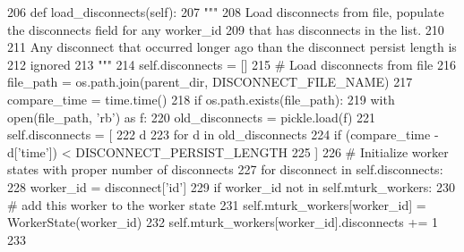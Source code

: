 \begin{DoxyCode}
206     \textcolor{keyword}{def }load\_disconnects(self):
207         \textcolor{stringliteral}{"""}
208 \textcolor{stringliteral}{        Load disconnects from file, populate the disconnects field for any worker\_id}
209 \textcolor{stringliteral}{        that has disconnects in the list.}
210 \textcolor{stringliteral}{}
211 \textcolor{stringliteral}{        Any disconnect that occurred longer ago than the disconnect persist length is}
212 \textcolor{stringliteral}{        ignored}
213 \textcolor{stringliteral}{        """}
214         self.disconnects = []
215         \textcolor{comment}{# Load disconnects from file}
216         file\_path = os.path.join(parent\_dir, DISCONNECT\_FILE\_NAME)
217         compare\_time = time.time()
218         \textcolor{keywordflow}{if} os.path.exists(file\_path):
219             with open(file\_path, \textcolor{stringliteral}{'rb'}) \textcolor{keyword}{as} f:
220                 old\_disconnects = pickle.load(f)
221                 self.disconnects = [
222                     d
223                     \textcolor{keywordflow}{for} d \textcolor{keywordflow}{in} old\_disconnects
224                     \textcolor{keywordflow}{if} (compare\_time - d[\textcolor{stringliteral}{'time'}]) < DISCONNECT\_PERSIST\_LENGTH
225                 ]
226         \textcolor{comment}{# Initialize worker states with proper number of disconnects}
227         \textcolor{keywordflow}{for} disconnect \textcolor{keywordflow}{in} self.disconnects:
228             worker\_id = disconnect[\textcolor{stringliteral}{'id'}]
229             \textcolor{keywordflow}{if} worker\_id \textcolor{keywordflow}{not} \textcolor{keywordflow}{in} self.mturk\_workers:
230                 \textcolor{comment}{# add this worker to the worker state}
231                 self.mturk\_workers[worker\_id] = WorkerState(worker\_id)
232             self.mturk\_workers[worker\_id].disconnects += 1
233 
\end{DoxyCode}
\mbox{\label{classparlai_1_1mturk_1_1core_1_1dev_1_1worker__manager_1_1WorkerManager_ae36a4ae10235fed3001cbc9d1b15b079}} 
